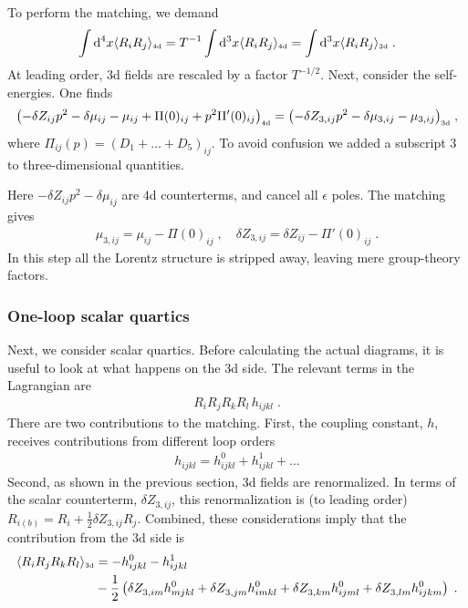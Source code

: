 \documentclass[11pt]{article}
\renewcommand{\nn}{\nonumber \\}
\newcommand{\rmii}[1]{{\mbox{\tiny\rm{#1}}}}
\begin{document}
To perform the matching,
we demand
\begin{align}
\int {\rm d}^4x 
\langle R_i R_j\rangle_\rmii{4d}=
T^{-1}\int {\rm d}^3x
\langle R_i R_j\rangle_\rmii{4d}=
\int {\rm d}^3x 
\langle R_i R_j\rangle_\rmii{3d}
\;.
\end{align}
At leading order, 3d fields are rescaled by a factor $T^{-1/2}$.
Next, consider the self-energies.
One finds 
\begin{align}
\bigl(
  - \delta Z_{i j}p^2
  - \delta \mu_{i j}
  - \mu_{i j}
  + \Pi(0)_{i j}
  + p^2 \Pi'(0)_{i j}
  \bigr)_\rmii{4d} =
\bigl(
  - \delta Z_{3,ij} p^2
  - \delta \mu_{3,i j}
  - \mu_{3,i j}
  \bigr)_\rmii{3d}
  \;,
\end{align}
where $\Pi_{ij}(p)=(D_1+\dots+D_5)_{ij}$.
To avoid confusion we added a subscript $3$ to three-dimensional quantities.

Here
$-\delta Z_{ij}p^2-\delta \mu_{i j}$
are $4$d counterterms, and
cancel all $\epsilon$ poles.
The matching gives
\begin{align}
  \mu_{3,i j}=\mu_{i j}-\Pi(0)_{i j}
  \;,\quad 
  \delta Z_{3,i j}=\delta Z_{i j}- \Pi'(0)_{i j}
  \;.
\end{align}
In this step all the Lorentz structure is stripped away,
leaving mere group-theory factors.

%
\subsubsection*{One-loop scalar quartics}
Next, we consider scalar quartics.
Before calculating the actual diagrams, it is 
useful to look at what happens on the 3d side.
The relevant terms in the Lagrangian are
\begin{align}
R_i R_j R_k R_l\,h_{i j k l}
  \;.
\end{align}
There are two contributions to the matching.
First, the coupling constant, $h$,
receives contributions from different loop orders
\begin{align}
h_{i j k l}^{ }=
    h^0_{i j k l}
  + h^1_{i j k l}
  + \ldots
\end{align}
Second, as shown in the previous section, $3$d fields are renormalized.
In terms of the scalar counterterm, $\delta Z_{3,i j}$,
this renormalization is (to leading order)
$ R_{i(b)}=R_i+\frac{1}{2}\delta Z_{3,i j}R_j$.
Combined, these considerations imply that the contribution from the 3d side is
\begin{align}
  \langle R_i R_j R_k R_l \rangle_\rmii{3d} &=
  - h_{i j k l}^0
  - h_{i j k l}^1
  \nn &
  - \frac{1}{2}\left(
    \delta Z_{3,i m}^{ }h_{m j k l}^0
  + \delta Z_{3,j m}^{ }h_{i m k l}^0
  + \delta Z_{3,k m}^{ }h_{i j m l}^0
  + \delta Z_{3,l m}^{ }h_{i j k m}^0
  \right)
  \;.
\end{align}
\end{document}
